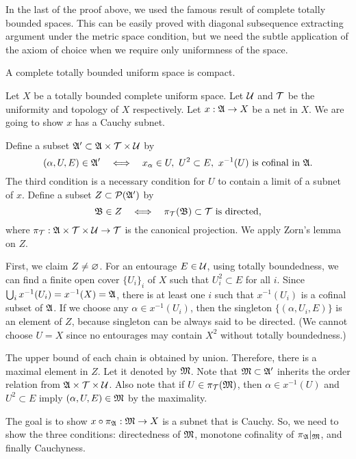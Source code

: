 \documentclass{../exp}
\begin{document}
In the last of the proof above, we used the famous result of complete totally bounded spaces.
This can be easily proved with diagonal subsequence extracting argument under the metric space condition, but we need the subtle application of the axiom of choice when we require only uniformness of the space.

\begin{thm}
A complete totally bounded uniform space is compact.
\end{thm}
\begin{pf}[1]
Let $X$ be a totally bounded complete uniform space.
Let $\mathcal{U}$ and $\mathcal{T}$ be the uniformity and topology of $X$ respectively.
Let $x:\fA\to X$ be a net in $X$.
We are going to show $x$ has a Cauchy subnet.


Define a subset $\mathfrak{A}'\subset\mathfrak{A}\times\mathcal{T}\times\mathcal{U}$ by
\[(\alpha,U,E)\in\fA'\iff x_\alpha\in U,\ U^2\subset E,\ x^{-1}(U)\text{ is cofinal in }\fA.\]
The third condition is a necessary condition for $U$ to contain a limit of a subnet of $x$.
Define a subset $Z\subset\mathcal{P}(\mathfrak{A}')$ by
\[\fB\in Z\iff \pi_\cT(\fB)\subset\cT\text{ is directed},\]
where $\pi_\cT:\fA\x\cT\x\cU\to\cT$ is the canonical projection.
We apply Zorn's lemma on $Z$.

First, we claim $Z\ne\varnothing$.
For an entourage $E\in\mathcal{U}$, using totally boundedness, we can find a finite open cover $\{U_i\}_i$ of $X$ such that $U_i^2\subset E$ for all $i$.
Since $\bigcup_ix^{-1}(U_i)=x^{-1}(X)=\mathfrak{A}$, there is at least one $i$ such that $x^{-1}(U_i)$ is a cofinal subset of $\mathfrak{A}$.
If we choose any $\alpha\in x^{-1}(U_i)$, then the singleton $\{(\alpha,U_i,E)\}$ is an element of $Z$, because singleton can be always said to be directed.
(We cannot choose $U=X$ since no entourages may contain $X^2$ without totally boundedness.)

The upper bound of each chain is obtained by union.
Therefore, there is a maximal element in $Z$.
Let it denoted by $\mathfrak{M}$.
Note that $\mathfrak{M}\subset\mathfrak{A}'$ inherits the order relation from $\mathfrak{A}\times\mathcal{T}\times\mathcal{U}$.
Also note that if $U\in\pi_{\mathcal{T}}(\mathfrak{M})$, then $\alpha\in x^{-1}(U)$ and $U^2\subset E$ imply $(\alpha,U,E)\in\mathfrak{M}$ by the maximality.


The goal is to show $x\o\pi_\fA:\fM\to X$ is a subnet that is Cauchy.
So, we need to show the three conditions: directedness of $\mathfrak{M}$, monotone cofinality of $\pi_{\mathfrak{A}}|_{\mathfrak{M}}$, and finally Cauchyness.


\end{pf}
\end{document}
